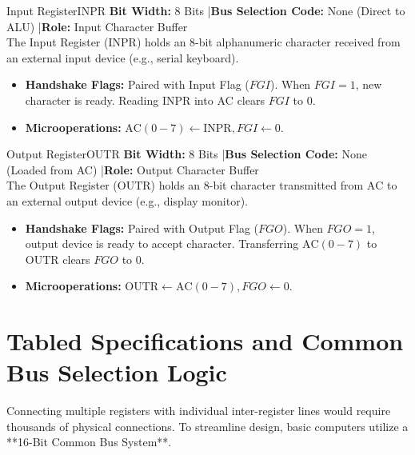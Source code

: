 \documentclass[11pt,a4paper]{article}
\begin{document}
\begin{registerbox}{Input Register}{INPR}
\textbf{Bit Width:} 8 Bits \quad|\quad \textbf{Bus Selection Code:} None (Direct to ALU) \quad|\quad \textbf{Role:} Input Character Buffer\\[0.1cm]
The Input Register ($\text{INPR}$) holds an 8-bit alphanumeric character received from an external input device (e.g., serial keyboard).
\begin{itemize}[noitemsep,topsep=2pt]
    \item \textbf{Handshake Flags:} Paired with Input Flag ($FGI$). When $FGI=1$, new character is ready. Reading $\text{INPR}$ into $\text{AC}$ clears $FGI$ to $0$.
    \item \textbf{Microoperations:} $\text{AC}(0-7) \leftarrow \text{INPR}, FGI \leftarrow 0$.
\end{itemize}
\end{registerbox}

\vspace{0.15cm}

\begin{registerbox}{Output Register}{OUTR}
\textbf{Bit Width:} 8 Bits \quad|\quad \textbf{Bus Selection Code:} None (Loaded from AC) \quad|\quad \textbf{Role:} Output Character Buffer\\[0.1cm]
The Output Register ($\text{OUTR}$) holds an 8-bit character transmitted from $\text{AC}$ to an external output device (e.g., display monitor).
\begin{itemize}[noitemsep,topsep=2pt]
    \item \textbf{Handshake Flags:} Paired with Output Flag ($FGO$). When $FGO=1$, output device is ready to accept character. Transferring $\text{AC}(0-7)$ to $\text{OUTR}$ clears $FGO$ to $0$.
    \item \textbf{Microoperations:} $\text{OUTR} \leftarrow \text{AC}(0-7), FGO \leftarrow 0$.
\end{itemize}
\end{registerbox}

\newpage

\section{\textcolor{primaryblue}{Tabled Specifications and Common Bus Selection Logic}}

Connecting multiple registers with individual inter-register lines would require thousands of physical connections. To streamline design, basic computers utilize a **16-Bit Common Bus System**.
\end{document}
